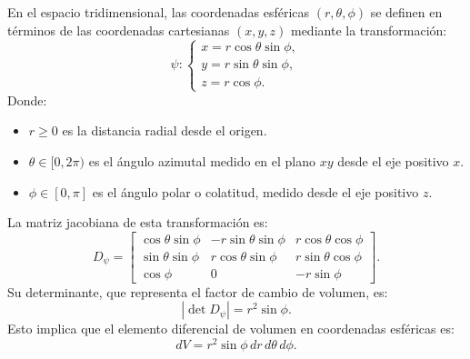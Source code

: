 \begin{definición}
    En el espacio tridimensional, las coordenadas esféricas $(r, \theta, \phi)$ se definen en términos de las coordenadas cartesianas $(x, y, z)$ mediante la transformación:  
    $$ 
    \psi:
    \begin{cases} 
        x = r\cos\theta \sin\phi, \\ 
        y = r\sin\theta \sin\phi, \\ 
        z = r\cos\phi.
    \end{cases}
    $$  
    Donde:  
    \begin{itemize}
        \item $r \geq 0$ es la distancia radial desde el origen.
        \item $\theta \in [0, 2\pi)$ es el ángulo azimutal medido en el plano $xy$ desde el eje positivo $x$.
        \item $\phi \in [0, \pi]$ es el ángulo polar o colatitud, medido desde el eje positivo $z$.
    \end{itemize}
    
    La matriz jacobiana de esta transformación es:  
    $$
    D_\psi =
    \begin{bmatrix}
        \cos\theta \sin\phi & -r\sin\theta \sin\phi & r\cos\theta \cos\phi \\  
        \sin\theta \sin\phi & r\cos\theta \sin\phi & r\sin\theta \cos\phi \\  
        \cos\phi & 0 & -r\sin\phi  
    \end{bmatrix}.
    $$
    Su determinante, que representa el factor de cambio de volumen, es:  
    $$ 
    \left| \det D_\psi \right| = r^2 \sin\phi.
    $$  
    Esto implica que el elemento diferencial de volumen en coordenadas esféricas es:  
    $$ 
    dV = r^2 \sin\phi \, dr \, d\theta \, d\phi.
    $$  
\end{definición}
